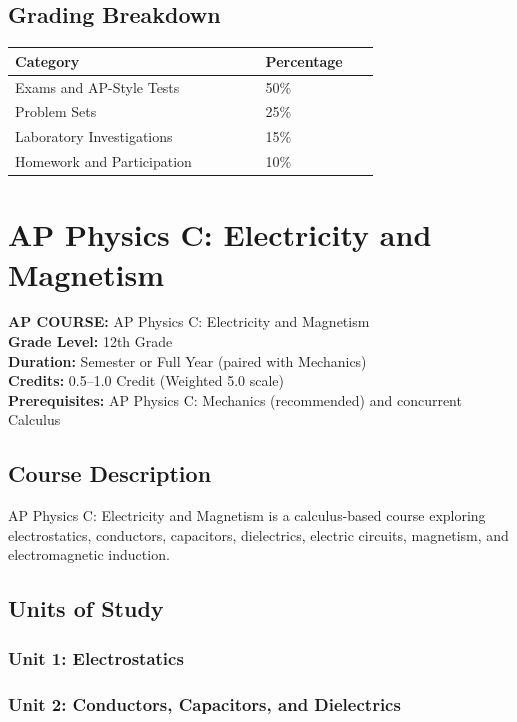 \documentclass[12pt,oneside]{book}
\begin{document}
\section{Grading Breakdown}
\begin{center}
\begin{tabular}{L{0.55\linewidth}L{0.25\linewidth}}
\toprule
\textbf{Category} & \textbf{Percentage} \\
\midrule
Exams and AP-Style Tests & 50\% \\
Problem Sets & 25\% \\
Laboratory Investigations & 15\% \\
Homework and Participation & 10\% \\
\bottomrule
\end{tabular}
\end{center}

\chapter{AP Physics C: Electricity and Magnetism}

\noindent\textbf{AP COURSE:} AP Physics C: Electricity and Magnetism\\
\textbf{Grade Level:} 12th Grade\\
\textbf{Duration:} Semester or Full Year (paired with Mechanics)\\
\textbf{Credits:} 0.5--1.0 Credit (Weighted 5.0 scale)\\
\textbf{Prerequisites:} AP Physics C: Mechanics (recommended) and concurrent Calculus

\section{Course Description}
AP Physics C: Electricity and Magnetism is a calculus-based course exploring electrostatics,
conductors, capacitors, dielectrics, electric circuits, magnetism, and electromagnetic induction.

\section{Units of Study}
\subsection*{Unit 1: Electrostatics}
\subsection*{Unit 2: Conductors, Capacitors, and Dielectrics}
\end{document}
